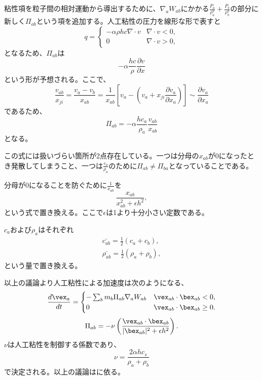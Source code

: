 \documentclass[]{jsarticle}
\begin{document}
粘性項を粒子間の相対運動から導出するために、$\nabla_aW_{ab}$にかかる$\frac{P_a}{\rho_a^2}+\frac{P_b}{\rho_b^2}$の部分に新しく$\Pi_{ab}$という項を追加する。人工粘性の圧力を線形な形で表すと
\begin{equation}
  q=\begin{cases}
    -\alpha \rho h c \nabla \cdot v & \nabla\cdot v<0, \\
    0 & \nabla \cdot v>0,
  \end{cases}
\end{equation}
となるため、$\Pi_{ab}$は
\begin{equation}
  -\alpha \frac{hc}{\rho}\frac{\partial v}{\partial x}
\end{equation}
という形が予想される。ここで、
\begin{equation}
  \frac{v_{ab}}{x_{ji}}=\frac{v_a-v_b}{x_{ab}}=\frac{1}{x_{ab}}\left[ v_a-\left( v_a+x_{ji}\frac{\partial v_a}{\partial x_a} \right) \right] \sim \frac{\partial v_a}{\partial x_a}
\end{equation}
であるため、
\begin{equation}
\Pi_{ab}=-\alpha \frac{hc_a}{\rho_a}\frac{v_{ab}}{x_{ab}}
\end{equation}
となる。

この式には扱いづらい箇所が2点存在している。一つは分母の$x_{ab}$が$0$になったとき発散してしまうこと、一つは$\frac{c_a}{\rho_a}$のために$\Pi_{ab}\neq\Pi_{ba}$となっていることである。

分母が0になることを防ぐために$\frac{1}{x_{ab}}$を
\begin{equation}
\frac{x_{ab}}{x_{ab}^2+\epsilon h^2},
\end{equation}
という式で置き換える。ここで$\epsilon$は1より十分小さい定数である。

$c_a$および$\rho_a$はそれぞれ
\begin{equation}
  \begin{split}
  \bar{c_{ab}}=\frac{1}{2}(c_a+c_b), \\
  \bar{\rho_{ab}}=\frac{1}{2}(\rho_a+\rho_b),
  \end{split}
\end{equation}
という量で置き換える。

以上の議論より人工粘性による加速度は次のようになる、
\begin{equation}
\frac{d\vex_a}{dt}=\begin{cases}
  -\sum_bm_b\Pi_{ab}\nabla_aW_{ab} & \vex_{ab}\cdot\bex_{ab}<0, \\
  0 & \vex_{ab}\cdot\bex_{ab}\geq0.
\end{cases}
\end{equation}
\begin{equation}
\Pi_{ab}=-\nu\left(\frac{\vex_{ab}\cdot\bex_{ab}}{|\bex_{ab}|^2+\epsilon h^2}\right).
\end{equation}
$\nu$は人工粘性を制御する係数であり、
\begin{equation}
  \label{eqn:kinArtVisc}
  \nu=\frac{2\alpha h c_s}{\rho_a+\rho_b}
\end{equation}
で決定される。以上の議論は\cite{Monaghan1983}に依る。
\end{document}
